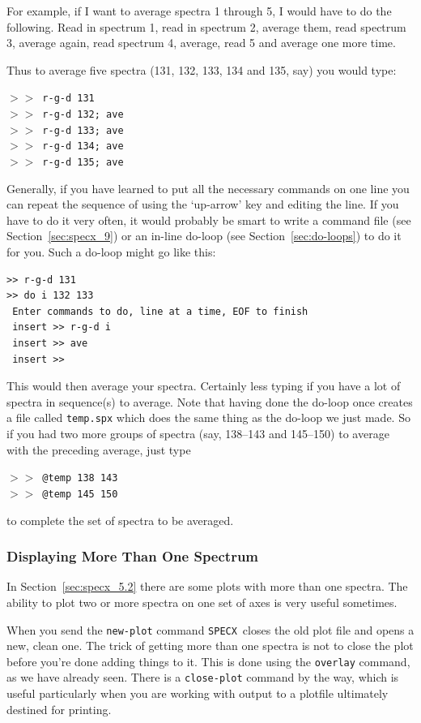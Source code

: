 \documentclass[11pt,twoside]{article}
\newcommand{\SPECX}{{\tt SPECX}}
\newcommand{\SP}{{$>\!>$}}
\begin{document}
For example, if I want to average spectra 1 through 5, I would have
to do the following.  Read in spectrum 1, read in spectrum 2, average
them, read spectrum 3, average again, read spectrum 4, average, read 5
and average one more time.

Thus to average five spectra (131, 132, 133, 134 and 135, say) you
would type:

\SP\ {\tt r-g-d 131}\\
\SP\ {\tt r-g-d 132; ave}\\
\SP\ {\tt r-g-d 133; ave}\\
\SP\ {\tt r-g-d 134; ave}\\
\SP\ {\tt r-g-d 135; ave}

Generally, if you have learned to put all the necessary commands on
one line you can repeat the sequence of using the `up-arrow' key and
editing the line. If you have to do it very often, it would probably
be smart to write a command file (see Section~\ref{sec:specx_9}) or an
in-line do-loop (see Section~\ref{sec:do-loops}) to do it for
you. Such a do-loop might go like this:
\begin{verbatim}
>> r-g-d 131
>> do i 132 133
 Enter commands to do, line at a time, EOF to finish
 insert >> r-g-d i
 insert >> ave
 insert >>
\end{verbatim}
This would then average your spectra. Certainly less typing if you
have a lot of spectra in sequence(s) to average. Note that having done
the do-loop once creates a file called {\tt temp.spx} which does the
same thing as the do-loop we just made. So if you had two more groups
of spectra (say, 138--143 and 145--150) to average with the preceding
average, just type

\SP\ \verb|@temp 138 143|\\
\SP\ \verb|@temp 145 150|

to complete the set of spectra to be averaged.

\subsubsection{Displaying More Than One Spectrum}
\label{sec:specx_8.3}
In Section~\ref{sec:specx_5.2} there are some plots with more than one
spectra. The ability to plot two or more spectra on one set of axes is
very useful sometimes.

When you send the {\tt new-plot} command \SPECX\ closes the old plot
file and opens a new, clean one.  The trick of getting more than one
spectra is not to close the plot before you're done adding things to
it. This is done using the {\tt overlay} command, as we have already
seen. There is a {\tt close-plot} command by the way, which is useful
particularly when you are working with output to a plotfile ultimately
destined for printing.
\end{document}
